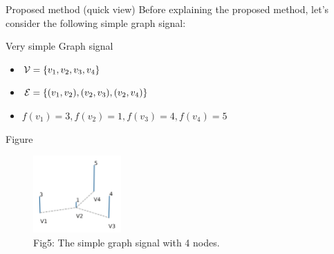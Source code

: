 \documentclass[
  ignorenonframetext,
]{beamer}
\providecommand{\tightlist}{%
  \setlength{\itemsep}{0pt}\setlength{\parskip}{0pt}}\usepackage{longtable,booktabs,array}
\begin{document}
\begin{frame}{Proposed method (quick view)}
\label{proposed-method-quick-view}
Before explaining the proposed method, let's consider the following
simple graph signal:

\begin{block}{Very simple Graph signal}
\begin{itemize}
\tightlist
\item
  \({\cal V}=\{v_1,v_2,v_3,v_4\}\)
\item
  \({\cal E}=\{(v_1,v_2), (v_2,v_3), (v_2,v_4) \}\)
\item
  \(f(v_1)=3, f(v_2)=1, f(v_3)=4, f(v_4)=5\)
\end{itemize}
\end{block}

\begin{block}{Figure}
\begin{figure}[H]

{\centering \includegraphics[width=0.3\textwidth,height=\textheight]{Beamer_files/figure-beamer/5fe2f6fb-8de3-4c35-b640-b4e436298018-1-a3fa2fbe-acea-4be6-8c44-c8781282a44f.png}

}

\caption{Fig5: The simple graph signal with 4 nodes.}

\end{figure}%
\end{block}
\end{frame}
\end{document}
